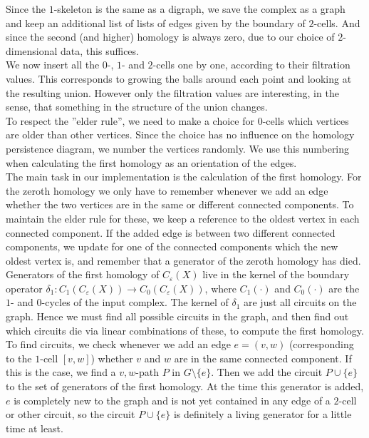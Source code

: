 \documentclass[11pt, a4paper, UKenglish]{article}
\begin{document}
    Since the $1$-skeleton is the same as a digraph, we save the complex as a graph and keep an additional list of lists of edges given by the boundary of $2$-cells.
    And since the second (and higher) homology is always zero, due to our choice of $2$-dimensional data, this suffices.\\
    We now insert all  the $0$-, $1$- and $2$-cells one by one, according to their filtration values. 
    This corresponds to growing the balls around each point and looking at the resulting union. 
    However only the filtration values are interesting, in the sense, that something in the structure of the union changes.\\
    To respect the ''elder rule'', we need to make a choice for $0$-cells which vertices are older than other vertices.
    Since the choice has no influence on the homology persistence diagram, we number the vertices randomly.
    We use this numbering when calculating the first homology as an orientation of the edges.\\
    The main task in our implementation is the calculation of the first homology.
    For the zeroth homology we only have to remember whenever we add an edge whether the two vertices are in the same or different connected components.
    To maintain the elder rule for these, we keep a reference to the oldest vertex in each connected component.
    If the added edge is between two different connected components, we update for one of the connected components which the new oldest vertex is, and remember that a generator of the zeroth homology has died.\\
    Generators of the first homology of $C_\varepsilon(X)$ live in the kernel of the boundary operator $\delta_1:C_1(C_\varepsilon(X))\rightarrow C_0(C_\varepsilon(X))$, where $C_1(\cdot)$ and $C_0(\cdot)$ are the $1$- and $0$-cycles of the input complex.
    The kernel of $\delta_1$ are just all circuits on the graph.
    Hence we must find all possible circuits in the graph, and then find out which circuits die via linear combinations of these, to compute the first homology.
    To find circuits, we check whenever we add an edge $e=(v,w)$ (corresponding to the $1$-cell $[v,w]$) whether $v$ and $w$ are in the same connected component.
    If this is the case, we find a $v,w$-path $P$ in $G\setminus \{e\}$.
    Then we add the circuit $P\cup \{e\}$ to the set of generators of the first homology.
    At the time this generator is added, $e$ is completely new to the graph and is not yet contained in any edge of a $2$-cell or other circuit, so the circuit $P\cup\{e\}$ is definitely a living generator for a little time at least.\\
\end{document}
